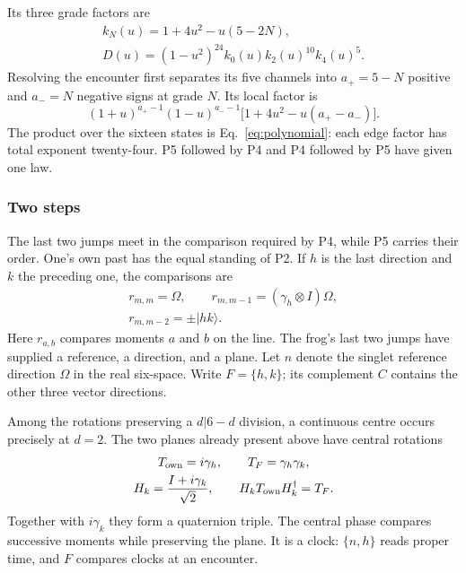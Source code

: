 \documentclass[aps,prx,reprint,longbibliography]{revtex4-2}
\begin{document}
Its three grade factors are
\begin{equation}
 \begin{gathered}
 k_N(u)=1+4u^2-u(5-2N),\\
 D(u)=(1-u^2)^{24}k_0(u)k_2(u)^{10}k_4(u)^5.
 \end{gathered}
 \label{eq:polynomial}
\end{equation}
Resolving the encounter first separates its five channels into $a_+=5-N$ positive and $a_-=N$ negative signs at grade $N$. Its local factor is
\begin{equation}
 (1+u)^{a_+-1}(1-u)^{a_--1}
 \bigl[1+4u^2-u(a_+-a_-)\bigr].
 \label{eq:encounter_first}
\end{equation}
The product over the sixteen states is Eq.~\eqref{eq:polynomial}: each edge factor has total exponent twenty-four. P5 followed by P4 and P4 followed by P5 have given one law.

\subsubsection{Two steps}
\label{sec:two_steps}

The last two jumps meet in the comparison required by P4, while P5 carries their order. One's own past has the equal standing of P2. If $h$ is the last direction and $k$ the preceding one, the comparisons are
\begin{equation}
\begin{gathered}
 r_{m,m}=\Omega,\qquad r_{m,m-1}=(\gamma_h\otimes I)\Omega,\\
 r_{m,m-2}=\pm\lvert hk\rangle.
 \end{gathered}
 \label{eq:three_comparisons}
\end{equation}
Here $r_{a,b}$ compares moments $a$ and $b$ on the line. The frog's last two jumps have supplied a reference, a direction, and a plane. Let $n$ denote the singlet reference direction $\Omega$ in the real six-space. Write $F=\{h,k\}$; its complement $C$ contains the other three vector directions.

Among the rotations preserving a $d|6-d$ division, a continuous centre occurs precisely at $d=2$. The two planes already present above have central rotations
\begin{equation}
 \begin{gathered}
 T_{\rm own}=i\gamma_h,\qquad T_F=\gamma_h\gamma_k,\\
 H_k=\frac{I+i\gamma_k}{\sqrt2},\qquad
 H_kT_{\rm own}H_k^\dagger=T_F.
 \end{gathered}
 \label{eq:clocks}
\end{equation}
Together with $i\gamma_k$ they form a quaternion triple. The central phase compares successive moments while preserving the plane. It is a clock: $\{n,h\}$ reads proper time, and $F$ compares clocks at an encounter.
\end{document}
